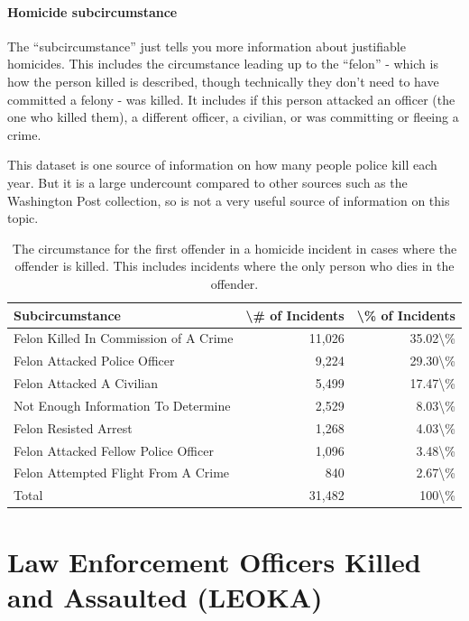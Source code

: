 \documentclass[
  12pt,
  openany]{book}
\begin{document}
\subsubsection{Homicide subcircumstance}\label{homicide-subcircumstance}

The ``subcircumstance'' just tells you more information about justifiable homicides. This includes the circumstance leading up to the ``felon'' - which is how the person killed is described, though technically they don't need to have committed a felony - was killed. It includes if this person attacked an officer (the one who killed them), a different officer, a civilian, or was committing or fleeing a crime.

This dataset is one source of information on how many people police kill each year. But it is a large undercount compared to other sources such as the Washington Post collection, so is not a very useful source of information on this topic.

\begin{longtable}[t]{lrr}
\caption{\label{tab:shrSubCircumstance}The circumstance for the first offender in a homicide incident in cases where the offender is killed. This includes incidents where the only person who dies in the offender.}\\
\toprule
Subcircumstance & \textbackslash{}\# of Incidents & \textbackslash{}\% of Incidents\\
\midrule
Felon Killed In Commission of A Crime & 11,026 & 35.02\textbackslash{}\%\\
Felon Attacked Police Officer & 9,224 & 29.30\textbackslash{}\%\\
Felon Attacked A Civilian & 5,499 & 17.47\textbackslash{}\%\\
Not Enough Information To Determine & 2,529 & 8.03\textbackslash{}\%\\
Felon Resisted Arrest & 1,268 & 4.03\textbackslash{}\%\\
\addlinespace
Felon Attacked Fellow Police Officer & 1,096 & 3.48\textbackslash{}\%\\
Felon Attempted Flight From A Crime & 840 & 2.67\textbackslash{}\%\\
Total & 31,482 & 100\textbackslash{}\%\\
\bottomrule
\end{longtable}

\chapter{Law Enforcement Officers Killed and Assaulted (LEOKA)}\label{leoka}
\end{document}
